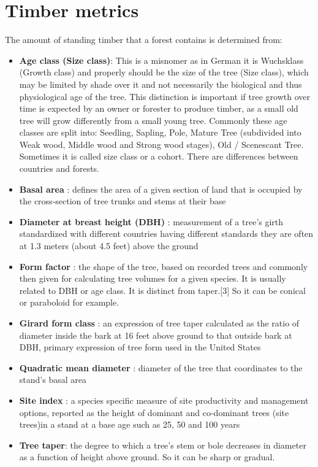 \section{Timber metrics}

The amount of standing timber that a forest contains is determined from:

\begin{itemize}
\item \textbf{Age class (Size class)}: This is a misnomer as in German it is Wuchsklass (Growth class) and properly should be the size of the tree (Size class), which may be limited by shade over it and not necessarily the biological and thus physiological age of the tree. This distinction is important if tree growth over time is expected by an owner or forester to produce timber, as a small old tree will grow differently from a small young tree. Commonly these age classes are split into: Seedling, Sapling, Pole, Mature Tree (subdivided into Weak wood, Middle wood and Strong wood stages), Old / Scenescant Tree. Sometimes it is called size class or a cohort. There are differences between countries and forests.
\item \textbf{Basal area }:  defines the area of a given section of land that is occupied by the cross-section of tree trunks and stems at their base
\item \textbf{Diameter at breast height (DBH) }:  measurement of a tree's girth standardized with different countries having different standards they are often at 1.3 meters (about 4.5 feet) above the ground
\item \textbf{Form factor }:  the shape of the tree, based on recorded trees and commonly then given for calculating tree volumes for a given species. It is usually related to DBH or age class. It is distinct from taper.[3] So it can be conical or paraboloid for example.
\item \textbf{Girard form class }:  an expression of tree taper calculated as the ratio of diameter inside the bark at 16 feet above ground to that outside bark at DBH, primary expression of tree form used in the United States
\item \textbf{Quadratic mean diameter }:  diameter of the tree that coordinates to the stand's basal area
\item \textbf{Site index }:  a species specific measure of site productivity and management options, reported as the height of dominant and co-dominant trees (site trees)in a stand at a base age such as 25, 50 and 100 years
\item \textbf{Tree taper}: the degree to which a tree's stem or bole decreases in diameter as a function of height above ground. So it can be sharp or gradual.
\end{itemize}

